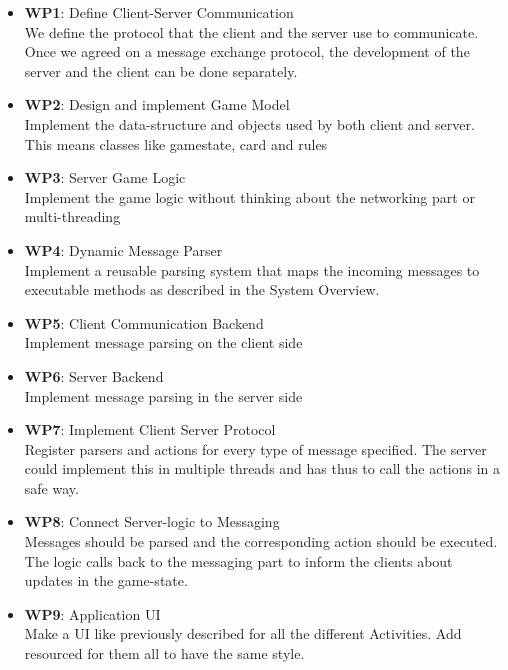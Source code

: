 \documentclass{sig-alternate}
\begin{document}
\begin{itemize}
	
        \item {\bf WP1}: Define Client-Server Communication\\
        We define the protocol that the client and the server use to communicate. Once we agreed on a message exchange protocol, the development of the server and the client can be done separately.
        
        \item {\bf WP2}: Design and implement Game Model\\
        Implement the data-structure and objects used by both client and server. This means classes like gamestate, card and rules
        
        \item {\bf WP3}: Server Game Logic\\
        Implement the game logic without thinking about the networking part or multi-threading
        
        \item {\bf WP4}: Dynamic Message Parser\\
		Implement a reusable parsing system that maps the incoming messages to executable methods as described in the System Overview.
           
        \item {\bf WP5}: Client Communication Backend\\
		Implement message parsing on the client side
		
		\item {\bf WP6}: Server Backend\\
		Implement message parsing in the server side
		
		\item {\bf WP7}: Implement Client Server Protocol\\
		Register parsers and actions for every type of message specified. The server could implement this in multiple threads and has thus to call the actions in a safe way.
		
		\item {\bf WP8}: Connect Server-logic to Messaging\\
		Messages should be parsed and the corresponding action should be executed. The logic calls back to the messaging part to inform the clients about updates in the game-state.
		\item {\bf WP9}: Application UI\\
		Make a UI like previously described for all the different Activities. Add resourced for them all to have the same style.
		

\end{itemize}
\end{document}
